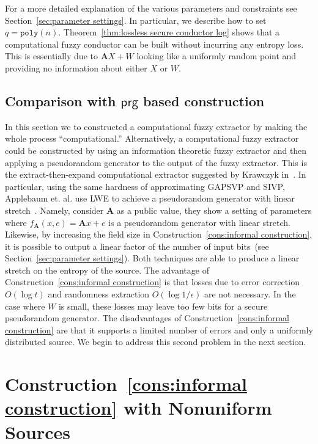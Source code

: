 \documentclass[11pt]{article}
\newcommand{\secref}[1]{\mbox{Section~\ref{#1}}}
\newcommand{\thref}[1]{\mbox{Theorem~\ref{#1}}}
\newcommand{\consref}[1]{\mbox{Construction~\ref{#1}}}
\newcommand{\class}[1]{{\ensuremath{\mathsf{#1}}}}
\newcommand{\prg}{\ensuremath{\class{prg}}\xspace}
\newcommand{\vect}[1]{\ensuremath{\textbf{#1}}}
\newcommand{\poly}{\ensuremath{\mathtt{poly}}\xspace}
\newcommand{\vA}{\vect{A}}
\begin{document}
For a more detailed explanation of the various parameters and constraints see \secref{sec:parameter settings}.  In particular, we describe how to set $q = \poly(n)$.  
\thref{thm:lossless secure conductor log} shows that a computational fuzzy conductor can be built without incurring any entropy loss.  This is essentially due to $\vA X+W$ looking like a uniformly random point and providing no information about either $X$ or $W$.  

\subsection{Comparison with \prg based construction}
\label{sec:prg based comparison}
In this section we to constructed a computational fuzzy extractor by making the whole process ``computational.''  Alternatively, a computational fuzzy extractor could be constructed by using an information theoretic fuzzy extractor and then applying a pseudorandom generator to the output of the fuzzy extractor.  This is the extract-then-expand computational extractor suggested by Krawczyk in~\cite{krawczyk2010cryptographic}.  In particular, using the same hardness of approximating GAPSVP and SIVP, Applebaum et. al. use LWE to achieve a pseudorandom generator with linear stretch~\cite{applebaum2006pseudorandom}.  Namely, consider $\vA$ as a public value, they show a setting of parameters where $f_\vA(x, e) = \vA x + e$ is a pseudorandom generator with linear stretch.  Likewise, by increasing the field size in \consref{cons:informal construction}, it is possible to output a linear factor of the number of input bits~(see \secref{sec:parameter settings}).  Both techniques are able to produce a linear stretch on the entropy of the source.  The advantage of \consref{cons:informal construction} is that losses due to error correction $O(\log t)$ and randomness extraction $O(\log 1/\epsilon)$ are not necessary.  In the case where $W$ is small, these losses may leave too few bits for a secure pseudorandom generator.  The disadvantages of \consref{cons:informal construction} are that it supports a limited number of errors and only a uniformly distributed source.  We begin to address this second problem in the next section.

\section{\consref{cons:informal construction} with Nonuniform Sources}
\end{document}
